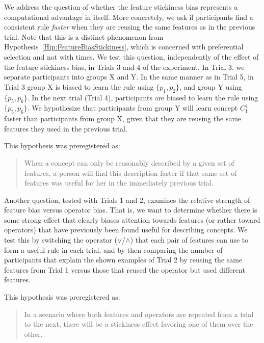 \begin{hyp}\label{Hip:FeatureBiasTimeAdvantage}
We address the question of whether the feature stickiness bias represents a computational advantage in itself. More concretely, we ask if participants find a consistent rule {\it faster} when they are reusing the same features as in the previous trial.  Note that this is a distinct phenomenon from Hypothesis~\ref{Hip:FeatureBiasStickiness}, which is concerned with preferential selection and not with times. 
We test this question, independently of the effect of the feature stickiness bias, in Trials 3 and 4 of the experiment. In Trial 3, we separate participants into groups X and Y. In the same manner as in Trial 5, in Trial 3 group X is biased to learn the rule using $\{p_1, p_2\}$, and group Y using $\{p_5, p_6\}$. In the next trial (Trial 4), participants are biased to learn the rule using $\{p_5, p_6\}$. We hypothesize that participants from group Y will learn concept $C^4_1$ faster than participants from group X, given that they are reusing the same features they used in the previous trial.


This hypothesis was preregistered as:
\begin{quote}
When a concept can only be reasonably described by a given set of features, a person will find this description faster if that same set of features was useful for her in the immediately previous trial.
\end{quote}
\end{hyp}

\begin{hyp} \label{Hip:StickinessFeatureOperator}


 Another question, tested with Trials 1 and 2, examines the relative strength of feature bias versus operator bias. That is, we want to determine whether there is some strong effect that clearly biases attention towards features (or rather toward operators) that have previously been found useful for describing concepts. We test this by switching the operator ($\lor$/$\land$) that each pair of features can use to form a useful rule in each trial, and by then comparing the number of participants that explain the shown examples of Trial 2 by reusing the same features from Trial 1 versus those that reused the operator but used different features.
 

 
 This hypothesis was preregistered as:
\begin{quote}
 In a scenario where both features and operators are repeated from a trial to the next, there will be a stickiness effect favoring one of them over the other.
\end{quote}

\end{hyp}


